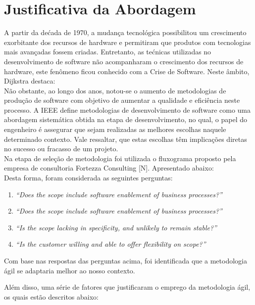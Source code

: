 \section{Justificativa da Abordagem}
\label{sec:nova_sess_o}

\tab A partir da dećada de 1970, a mudança tecnológica  possibilitou um crescimento exorbitante dos recursos de hardware e permitiram que produtos com tecnologias mais avançadas fossem criadas. Entretanto, as tećnicas utilizadas no desenvolvimento  de software não acompanharam o crescimento dos recursos de hardware, este fenômeno ficou conhecido com a Crise de Software. Neste âmbito, Dijkstra destaca:\\


\tab Não obstante,  ao longo dos anos, notou-se o aumento de metodologias de produção de software com objetivo de aumentar a qualidade e eficiência neste processo. A IEEE define metodologias de desenvolvimento de software como uma abordagem sistemática obtida na etapa de desenvolvimento, no qual, o papel do engenheiro é assegurar que sejam realizadas as melhores escolhas naquele determinado contexto. Vale ressaltar, que estas escolhas têm implicações diretas no sucesso ou fracasso de um projeto.\\

\tab Na etapa de seleção de metodologia foi utilizada o fluxograma proposto pela empresa de consultoria Fortezza Consulting [N]. Apresentado abaixo: \\

\tab Desta forma, foram considerada as seguintes perguntas: \\

\begin{enumerate}
	\item \textsl{“Does the scope include software enablement of business processes?”}
	\item \textsl{“Does the scope include software enablement of business processes?”}
	\item \textsl{“Is the scope lacking in specificity, and unlikely to remain stable?”}
	\item \textsl{“Is the customer willing and able to offer flexibility on scope?”}
\end{enumerate}

\tab Com base nas respostas das perguntas acima, foi identificada que a metodologia ágil se adaptaria melhor ao nosso contexto.

\tab Além disso, uma série de fatores que justificaram o emprego da metodologia ágil, os quais estão descritos abaixo:

